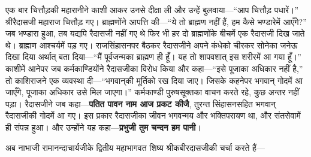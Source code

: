\begin{sloppypar}\justifying{}
एक बार चित्तौड़की महारानीने काशी आकर उनसे दीक्षा ली और उन्हें बुलवाया—“आप चित्तौड़ पधारें।” श्रीरैदासजी महाराज चित्तौड़ गए। ब्राह्मणोंने आपत्ति की—“ये तो ब्राह्मण नहीं हैं, हम कैसे भण्डारेमें आएँगे?” जब भण्डारा हुआ, तब यद्यपि रैदासजी नहीं गए थे फिर भी हर दो ब्राह्मणोंके बीचमें एक रैदासजी दिख जाते थे। ब्राह्मण आश्चर्यमें पड़ गए। राज\-सिंहासनपर बैठकर रैदासजीने अपने कंधेको चीरकर सोनेका जनेऊ दिखा दिया अर्थात् बता दिया—“मैं पूर्वजन्मका ब्राह्मण ही हूँ। यह तो शापवशात् इस शरीरमें आ गया हूँ।” काशीमें आनेपर जब कर्मकाण्डियोंने रैदासजीका विरोध किया और कहा—“इसे पूजाका अधिकार नहीं है,” तो काशिराजने एक व्यवस्था दी—“भगवान्‌की मूर्तिको रख दिया जाए। जिसके कहनेपर भगवान् गोदमें आ जाएँगे, पूजाका अधिकार उसे मिल जाएगा।” कर्मकाण्डी पुरुष\-सूक्तका वाचन करते रहे, कुछ अन्तर नहीं पड़ा। रैदासजीने जब कहा—\textbf{पतित पावन नाम आज प्रकट कीजै}, तुरन्त सिंहासन\-सहित भगवान् रैदासजीकी गोदमें आ गए। इस प्रकार रैदासजीका जीवन भगवन्मय और भक्तिपरायण था, और संत\-सेवामें ही संपन्न हुआ। और उन्होंने यह कहा—\textbf{प्रभुजी तुम चन्दन हम पानी}।
\end{sloppypar}
\begin{sloppypar}\justifying{}
अब नाभाजी रामानन्दाचार्यजीके द्वितीय महाभागवत शिष्य श्रीकबीर\-दासजीकी चर्चा करते हैं—
\end{sloppypar}


